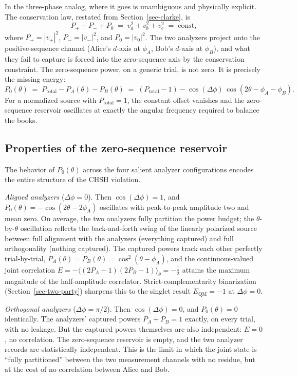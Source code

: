 \documentclass[
  11pt]{article}
\begin{document}
In the three-phase analog, where it goes is unambiguous and physically
explicit. The conservation law, restated from Section~\ref{sec-clarke},
is \[
P_+ + P_- + P_0 \;=\; v_a^2 + v_b^2 + v_c^2 \;=\; \mathrm{const},
\] where \(P_+ = |v_+|^2\), \(P_- = |v_-|^2\), and \(P_0 = |v_0|^2\).
The two analyzers project onto the positive-sequence channel (Alice's
\(d\)-axis at \(\phi_A\), Bob's \(d\)-axis at \(\phi_B\)), and what they
fail to capture is forced into the zero-sequence axis by the
conservation constraint. The zero-sequence power, on a generic trial, is
not zero. It is precisely the missing energy: \[
P_0(\theta) \;=\; P_\text{total} - P_A(\theta) - P_B(\theta) \;=\; (P_\text{total} - 1) - \cos(\Delta\phi)\,\cos(2\theta - \phi_A - \phi_B).
\] For a normalized source with \(P_\text{total} = 1\), the constant
offset vanishes and the zero-sequence reservoir oscillates at exactly
the angular frequency required to balance the books.

\subsection{Properties of the zero-sequence
reservoir}\label{properties-of-the-zero-sequence-reservoir}

The behavior of \(P_0(\theta)\) across the four salient analyzer
configurations encodes the entire structure of the CHSH violation.

\emph{Aligned analyzers} (\(\Delta\phi = 0\)). Then
\(\cos(\Delta\phi) = 1\), and \(P_0(\theta) = -\cos(2\theta - 2\phi_A)\)
oscillates with peak-to-peak amplitude two and mean zero. On average,
the two analyzers fully partition the power budget; the
\(\theta\)-by-\(\theta\) oscillation reflects the back-and-forth swing
of the linearly polarized source between full alignment with the
analyzers (everything captured) and full orthogonality (nothing
captured). The captured powers track each other perfectly
trial-by-trial, \(P_A(\theta) = P_B(\theta) = \cos^2(\theta - \phi_A)\),
and the continuous-valued joint correlation
\(E = -\langle (2P_A - 1)(2P_B - 1)\rangle_\theta = -\tfrac{1}{2}\)
attains the maximum magnitude of the half-amplitude correlator.
Strict-complementarity binarization (Section~\ref{sec-two-party})
sharpens this to the singlet result \(E_\text{QM} = -1\) at
\(\Delta\phi = 0\).

\emph{Orthogonal analyzers} (\(\Delta\phi = \pi/2\)). Then
\(\cos(\Delta\phi) = 0\), and \(P_0(\theta) = 0\) identically. The
analyzers' captured powers \(P_A + P_B = 1\) exactly, on every trial,
with no leakage. But the captured powers themselves are also
independent: \(E = 0\), no correlation. The zero-sequence reservoir is
empty, and the two analyzer records are statistically independent. This
is the limit in which the joint state is ``fully partitioned'' between
the two measurement channels with no residue, but at the cost of no
correlation between Alice and Bob.
\end{document}
